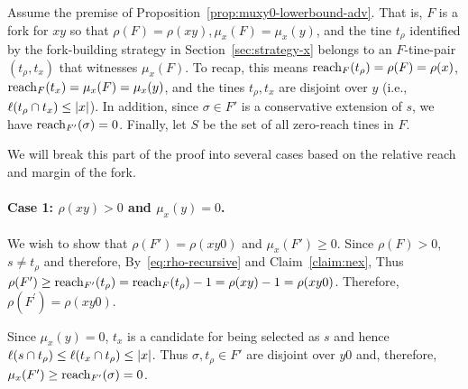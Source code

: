     Assume the premise of Proposition~\ref{prop:muxy0-lowerbound-adv}.
    That is, $F$ is a fork for $xy$ so that 
    $\rho(F) = \rho(xy), \mu_x(F) = \mu_x(y)$, 
    and the tine $t_\rho$ identified by the fork-building strategy in Section~\ref{sec:strategy-x} 
    belongs to an $F$-tine-pair $(t_\rho, t_x)$ that witnesses $\mu_x(F)$. 
    To recap, this means 
    $\operatorname{reach}_F(t_\rho) = \rho(F) = \rho(x)$, 
    $\operatorname{reach}_F(t_x) = \mu_x(F) = \mu_x(y)$,  
    and the tines $t_\rho, t_x$ are disjoint over $y$ 
    (i.e., $\ell(t_\rho \cap t_x) \leq |x|$). 
    In addition, since $\sigma \in F'$ is a conservative extension of $s$, 
    we have $\operatorname{reach}_{F'}(\sigma) = 0$.
    Finally, let $S$ be the set of all zero-reach tines in $F$.
    
    We will break this part of the proof into several cases 
    based on the relative reach and margin of the fork. 

    \paragraph{Case 1: $\rho(xy) > 0$ and $\mu_x(y)=0$.} 
    We wish to show that 
    $\rho(F') = \rho(xy0)$ and 
    $\mu_x(F') \geq 0$. 
    Since $\rho(F) > 0$, $s \neq t_\rho$ and therefore, 
    By~\eqref{eq:rho-recursive} and Claim~\ref{claim:nex}, 
    Thus 
    $\rho(F^\prime) 
    \geq \operatorname{reach}_{F'}(t_\rho) 
    = \operatorname{reach}_F(t_\rho) - 1 
    = \rho(xy) - 1 
    = \rho(xy0)
    $. Therefore, 
    $\rho(F^\prime) = \rho(xy0)$.

    Since $\mu_x(y)=0$, 
    $t_x$ is a candidate for being selected as $s$ and hence 
    $\ell(s \cap t_\rho) \leq \ell(t_x \cap t_\rho) \leq |x|$. 
    Thus $\sigma, t_\rho \in F'$ are disjoint over $y0$ 
    and, therefore, $\mu_x(F') \geq \operatorname{reach}_{F'}(\sigma) = 0$.
    

